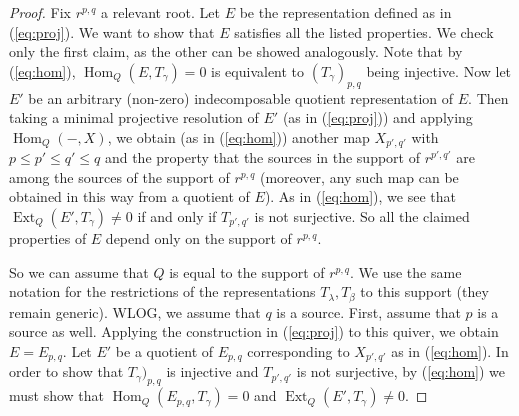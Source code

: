 \documentclass[twoside]{article}
\newcommand{\ds}{\displaystyle\sum}
\newcommand{\Hom}{\operatorname{Hom}}
\newcommand{\Ext}{\operatorname{Ext}}
\newcommand{\Rep}{\operatorname{Rep}}
\newcommand{\rank}{\operatorname{rank}}
\theoremstyle{definition}
\begin{document}
\begin{proof}
Fix $r^{p,q}$ a relevant root. Let $E$ be the representation defined as in (\ref{eq:proj}). We want to show that $E$ satisfies all the listed properties. We check only the first claim, as the other can be showed analogously. Note that by (\ref{eq:hom}),  $\Hom_Q(E,T_\gamma)=0$ is equivalent to $(T_{\gamma})_{p,q}$ being injective. Now let $E'$ be an arbitrary (non-zero) indecomposable quotient representation of $E$. Then taking a minimal projective resolution of $E'$ (as in (\ref{eq:proj})) and applying $\Hom_Q(-,X)$, we obtain (as in (\ref{eq:hom})) another map $X_{p',q'}$ with $p\leq p' \leq q' \leq q$ and the property that the sources in the support of $r^{p',q'}$ are among the sources of the support of $r^{p,q}$ (moreover, any such map can be obtained in this way from a quotient of $E$). As in (\ref{eq:hom}), we see that  $\Ext_Q(E',T_\gamma)\neq 0$ if and only if $T_{p',q'}$ is not surjective. So all the claimed properties of $E$ depend only on the support of $r^{p,q}$.


So we can assume that $Q$ is equal to the support of $r^{p,q}$. We use the same notation for the restrictions of the representations $T_\lambda,T_\beta$ to this support (they remain generic). WLOG, we assume that $q$ is a source. First, assume that $p$ is a source as well.  Applying the construction in (\ref{eq:proj}) to this quiver, we obtain $E=E_{p,q}$. Let $E'$ be a quotient of $E_{p,q}$ corresponding to $X_{p',q'}$ as in (\ref{eq:hom}). In order to show that $T_{\gamma})_{p,q}$ is injective and $T_{p',q'}$ is not surjective, by (\ref{eq:hom}) we must show that $\Hom_Q(E_{p,q},T_{\gamma})=0$ and $\Ext_Q(E',T_{\gamma})\neq 0$. 






\end{proof}
\end{document}
